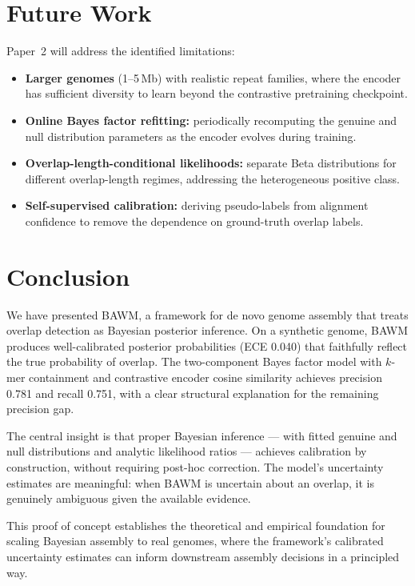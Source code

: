 \documentclass[11pt,a4paper]{article}
\begin{document}
\section{Future Work}
\label{sec:future}

Paper~2 will address the identified limitations:
\begin{itemize}
  \item \textbf{Larger genomes} (1--5\,Mb) with realistic repeat
    families, where the encoder has sufficient diversity to learn
    beyond the contrastive pretraining checkpoint.
  \item \textbf{Online Bayes factor refitting:} periodically
    recomputing the genuine and null distribution parameters as the
    encoder evolves during training.
  \item \textbf{Overlap-length-conditional likelihoods:} separate
    Beta distributions for different overlap-length regimes,
    addressing the heterogeneous positive class.
  \item \textbf{Self-supervised calibration:} deriving pseudo-labels
    from alignment confidence to remove the dependence on ground-truth
    overlap labels.
\end{itemize}


\section{Conclusion}
\label{sec:conclusion}

We have presented BAWM, a framework for de novo genome assembly that
treats overlap detection as Bayesian posterior inference.  On a
synthetic genome, BAWM produces well-calibrated posterior probabilities
(ECE 0.040) that faithfully reflect the true probability of overlap.
The two-component Bayes factor model with $k$-mer containment and
contrastive encoder cosine similarity achieves precision 0.781 and
recall 0.751, with a clear structural explanation for the remaining
precision gap.

The central insight is that proper Bayesian inference --- with fitted
genuine and null distributions and analytic likelihood ratios ---
achieves calibration by construction, without requiring post-hoc
correction.  The model's uncertainty estimates are meaningful: when
BAWM is uncertain about an overlap, it is genuinely ambiguous given
the available evidence.

This proof of concept establishes the theoretical and empirical
foundation for scaling Bayesian assembly to real genomes, where the
framework's calibrated uncertainty estimates can inform downstream
assembly decisions in a principled way.



\end{document}
